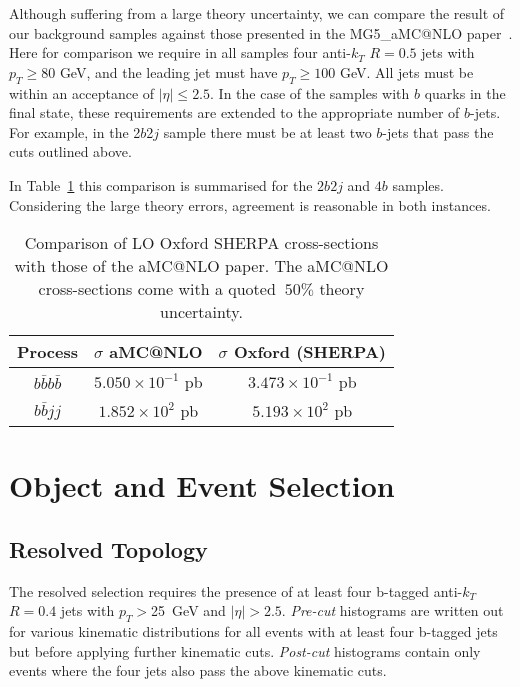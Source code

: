 \documentclass[12pt]{article}
\begin{document}
Although suffering from a large theory uncertainty, we can compare the result of our background samples against those presented in the MG5\_aMC@NLO paper~\cite{Alwall:2014hca}.
Here for comparison we require in all samples four anti-$k_T$ $R=0.5$ jets with $p_T \ge 80 $ GeV, and the leading jet must have $p_T \ge 100$ GeV. All jets must be within an acceptance of $|\eta| \le 2.5 $. In the case of the samples with $b$ quarks in the final state, these requirements are extended to the appropriate number of $b$-jets. For example, in the 2$b$2$j$ sample there must be at least two $b$-jets that pass the cuts outlined above.

In Table~\ref{tab:xsecs} this comparison is summarised for the $2b2j$ and $4b$ samples. Considering the large theory errors, agreement is reasonable in both instances.

\begin{table}[h]
\begin{center}
\begin{tabular}{|c|c|c|}
\hline
Process & $\sigma$ aMC@NLO & $\sigma$ Oxford (SHERPA) \\
\hline\hline
$b\bar{b}b\bar{b}$ & $5.050 \times  10^{-1}$ pb & $3.473\times10^{-1}$ pb \\ 
$b\bar{b}jj$ & $1.852 \times 10^2$ pb &$5.193 \times 10^2$ pb \\ 
\hline
\end{tabular}
\caption{Comparison of LO Oxford SHERPA cross-sections with those of the aMC@NLO paper. The aMC@NLO cross-sections come with a quoted $~50\%$ theory uncertainty.} \label{tab:xsecs}
\end{center}
\end{table}%
\section{Object and Event Selection}

\subsection{Resolved Topology}

The resolved selection requires the presence of at least four b-tagged anti-$k_T$ $R=0.4$ jets with $p_T >$25~GeV and $|\eta|>2.5$.
\textit{Pre-cut} histograms are written out for various kinematic distributions for all events with at least four b-tagged jets but before applying
further kinematic cuts. \textit{Post-cut} histograms contain only events where the four jets also pass the above kinematic cuts.
\end{document}
